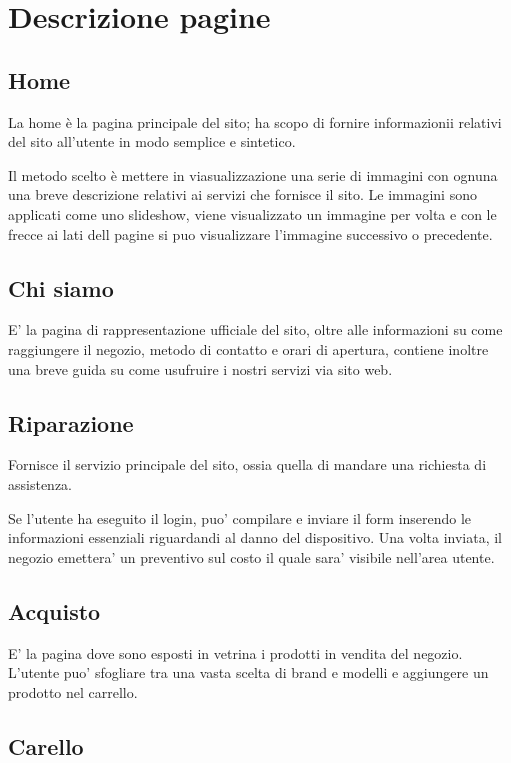\section{Descrizione pagine}

\subsection{Home}

La home è la pagina principale del sito; ha scopo di fornire informazionii relativi del sito
all'utente in modo semplice e sintetico.

Il metodo scelto è mettere in viasualizzazione una serie di immagini con ognuna una breve
descrizione relativi ai servizi che fornisce il sito. Le immagini sono applicati come uno slideshow,
viene visualizzato un immagine per volta e con le frecce ai lati dell pagine si puo visualizzare l'immagine
successivo o precedente.

\subsection{Chi siamo}

E' la pagina di rappresentazione ufficiale del sito, oltre alle informazioni su come raggiungere
il negozio, metodo di contatto e orari di apertura, contiene inoltre una breve guida su come 
usufruire i nostri servizi via sito web.

\subsection{Riparazione}

Fornisce il servizio principale del sito, ossia quella di mandare una richiesta di assistenza.

Se l'utente ha eseguito il login, puo' compilare e inviare il form inserendo le informazioni essenziali riguardandi
al danno del dispositivo. Una volta inviata, il negozio emettera' un preventivo sul costo il quale sara' visibile nell'area
utente.

\subsection{Acquisto}

E' la pagina dove sono esposti in vetrina i prodotti in vendita del negozio. L'utente puo' 
sfogliare tra una vasta scelta di brand e modelli e aggiungere un prodotto nel carrello.

\subsection{Carello}

